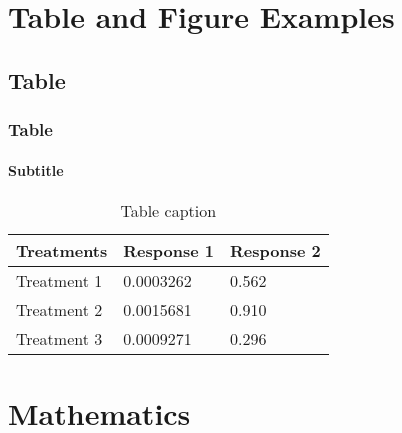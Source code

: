 \documentclass[
	9pt, %
]{beamer}
\begin{document}

\section{Table and Figure Examples}

\subsection{Table}

\begin{frame}
	\frametitle{Table}
	\framesubtitle{Subtitle} %

	\begin{table}
		\begin{tabular}{l l l}
			\toprule
			\textbf{Treatments} & \textbf{Response 1} & \textbf{Response 2}\\
			\midrule
			Treatment 1 & 0.0003262 & 0.562 \\
			Treatment 2 & 0.0015681 & 0.910 \\
			Treatment 3 & 0.0009271 & 0.296 \\
			\bottomrule
		\end{tabular}
		\caption{Table caption}
	\end{table}
\end{frame}


%
%


\section{Mathematics}
\end{document}
